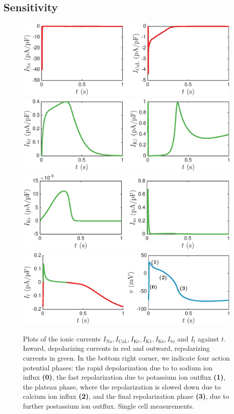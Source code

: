 \documentclass{article}
\begin{document}
\subsection{Sensitivity} \label{Sensitivity}
%
\begin{figure}
   \includegraphics[trim=0cm 0cm 0cm 0cm, clip=true, width=1\linewidth]{current1} 
   \includegraphics[trim=0cm 0cm 0cm 0cm, clip=true, width=1\linewidth]{current2} 
      \includegraphics[trim=0cm 0cm 0cm 0cm, clip=true, width=1\linewidth]{current3} 
         \includegraphics[trim=0cm 0cm 0cm 0cm, clip=true, width=1\linewidth]{current4} 
    \caption{Plots of the ionic currents $I_{\mathrm{Na}}, I_{\mathrm{CaL}}, I_{\mathrm{Kr}}, I_{\mathrm{K1}}, I_{\mathrm{Ks}}, I_{\mathrm{to}}$ and $I_{\mathrm{f}}$ against $t$. Inward, depolarizing currents in red and outward, repolarizing currents in green. In the bottom right corner, we indicate four action potential phases: the rapid depolarization due to to sodium ion influx \textbf{(0)}, the fast repolarization due to potassium ion outflux \textbf{(1)}, the plateau phase, where the repolarization is slowed down due to calcium ion influx \textbf{(2)}, and the final repolarization phase \textbf{(3)}, due to further postassium ion outflux. Single cell measurements.}
    \label{fig:current}
\end{figure}
\end{document}
